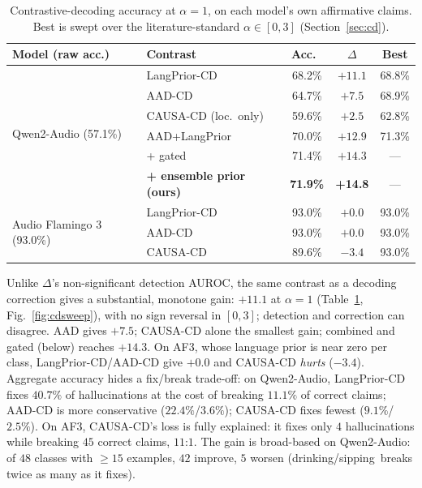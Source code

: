 \documentclass{article}
\newcommand{\qwenlangfix}{40.7\%}
\newcommand{\qwenlangbreak}{11.1\%}
\newcommand{\qwenaadfix}{22.4\%}
\newcommand{\qwenaadbreak}{3.6\%}
\newcommand{\qwencausafixpct}{9.1\%}
\newcommand{\qwencausabreakpct}{2.5\%}
\newcommand{\afcausafixn}{4}
\newcommand{\afcausabreakn}{45}
\newcommand{\langpriorbroadn}{48}
\newcommand{\langpriorbroadpos}{42}
\newcommand{\langpriorbroadneg}{5}
\newcommand{\langpriorworstclass}{drinking/sipping}
\begin{document}
\begin{table}[t]
\centering
\footnotesize
\caption{Contrastive-decoding accuracy at $\alpha{=}1$, on each model's own affirmative claims. Best is swept over the literature-standard $\alpha\in[0,3]$ (Section~\ref{sec:cd}).}
\label{tab:cd}
{\setlength{\tabcolsep}{1.5pt}
\begin{tabular}{@{}llccc@{}}
\toprule
Model (raw acc.) & Contrast & Acc.\ & $\Delta$ & Best \\
\midrule
\multirow{6}{*}{Qwen2-Audio (57.1\%)}
 & LangPrior-CD & 68.2\% & $+11.1$ & 68.8\% \\
 & AAD-CD       & 64.7\% & $+7.5$ & 68.9\% \\
 & CAUSA-CD (loc.\ only) & 59.6\% & $+2.5$ & 62.8\% \\
 & AAD+LangPrior          & 70.0\% & $+12.9$ & 71.3\% \\
 & + gated & 71.4\% & $+14.3$ & --- \\
 & \textbf{+ ensemble prior (ours)} & \textbf{71.9\%} & \textbf{+14.8} & --- \\
\midrule
\multirow{3}{*}{Audio Flamingo 3 (93.0\%)}
 & LangPrior-CD & 93.0\% & $+0.0$ & 93.0\% \\
 & AAD-CD       & 93.0\% & $+0.0$ & 93.0\% \\
 & CAUSA-CD     & 89.6\% & $-3.4$ & 93.0\% \\
\bottomrule
\end{tabular}}
\end{table}

Unlike $\Delta$'s non-significant detection AUROC, the same contrast as
a decoding correction gives a substantial, monotone gain: $+11.1$ at
$\alpha{=}1$ (Table~\ref{tab:cd}, Fig.~\ref{fig:cdsweep}), with no sign
reversal in $[0,3]$; detection and correction can disagree. AAD gives
$+7.5$; CAUSA-CD alone the smallest gain; combined and gated (below)
reaches $+14.3$. On AF3, whose language prior is near zero per class,
LangPrior-CD/AAD-CD give $+0.0$ and CAUSA-CD \emph{hurts} ($-3.4$).
Aggregate accuracy hides a fix/break trade-off: on Qwen2-Audio,
LangPrior-CD fixes $\qwenlangfix$ of hallucinations at the cost of
breaking $\qwenlangbreak$ of correct claims; AAD-CD is more
conservative ($\qwenaadfix$/$\qwenaadbreak$); CAUSA-CD fixes fewest
($\qwencausafixpct$/$\qwencausabreakpct$). On AF3, CAUSA-CD's loss is
fully explained: it fixes only $\afcausafixn$ hallucinations while
breaking $\afcausabreakn$ correct claims, $11$:$1$. The gain is
broad-based on Qwen2-Audio: of $\langpriorbroadn$ classes with
$\geq\!15$ examples, $\langpriorbroadpos$ improve, $\langpriorbroadneg$
worsen (\langpriorworstclass\ breaks twice as many as it fixes).
\end{document}
